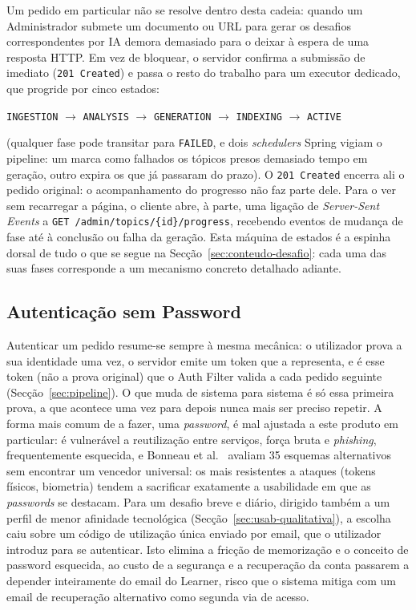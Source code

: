 Um pedido em particular não se resolve dentro desta cadeia: quando um Administrador submete um documento ou URL para gerar os desafios correspondentes por IA demora demasiado para o deixar à espera de uma resposta HTTP. Em vez de bloquear, o servidor confirma a submissão de imediato (\texttt{201 Created}) e passa o resto do trabalho para um executor dedicado, que progride por cinco estados:
\begin{center}
\texttt{INGESTION} $\rightarrow$ \texttt{ANALYSIS} $\rightarrow$ \texttt{GENERATION} $\rightarrow$ \texttt{INDEXING} $\rightarrow$ \texttt{ACTIVE}
\end{center}
(qualquer fase pode transitar para \texttt{FAILED}, e dois \textit{schedulers} Spring vigiam o pipeline: um marca como falhados os tópicos presos demasiado tempo em geração, outro expira os que já passaram do prazo). O \texttt{201 Created} encerra ali o pedido original: o acompanhamento do progresso não faz parte dele. Para o ver sem recarregar a página, o cliente abre, à parte, uma ligação de \textit{Server-Sent Events} a \texttt{GET /admin/topics/\{id\}/progress}, recebendo eventos de mudança de fase até à conclusão ou falha da geração. Esta máquina de estados é a espinha dorsal de tudo o que se segue na Secção~\ref{sec:conteudo-desafio}: cada uma das suas fases corresponde a um mecanismo concreto detalhado adiante.

\subsection{Autenticação sem Password} \label{sec:autenticacao}

Autenticar um pedido resume-se sempre à mesma mecânica: o utilizador prova a sua identidade uma vez, o servidor emite um token que a representa, e é esse token (não a prova original) que o Auth Filter valida a cada pedido seguinte (Secção~\ref{sec:pipeline}). O que muda de sistema para sistema é só essa primeira prova, a que acontece uma vez para depois nunca mais ser preciso repetir. A forma mais comum de a fazer, uma \textit{password}, é mal ajustada a este produto em particular: é vulnerável a reutilização entre serviços, força bruta e \textit{phishing}, frequentemente esquecida, e Bonneau et al.~\cite{bonneau2012} avaliam 35 esquemas alternativos sem encontrar um vencedor universal: os mais resistentes a ataques (tokens físicos, biometria) tendem a sacrificar exatamente a usabilidade em que as \textit{passwords} se destacam. Para um desafio breve e diário, dirigido também a um perfil de menor afinidade tecnológica (Secção~\ref{sec:usab-qualitativa}), a escolha caiu sobre um código de utilização única enviado por email, que o utilizador introduz para se autenticar. Isto elimina a fricção de memorização e o conceito de password esquecida, ao custo de a segurança e a recuperação da conta passarem a depender inteiramente do email do Learner, risco que o sistema mitiga com um email de recuperação alternativo como segunda via de acesso.

